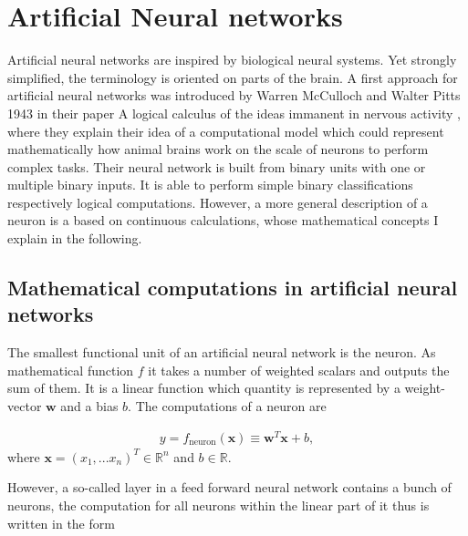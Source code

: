 




\section{Artificial Neural networks}
Artificial neural networks are inspired by biological neural systems. Yet strongly simplified, the terminology is oriented on parts of the brain. A first approach for artificial neural networks was introduced by Warren McCulloch and Walter Pitts 1943 in their paper \glqq A logical calculus of the ideas immanent in nervous activity\grqq{} \cite{mcculloch_logical_1943}, where they explain their idea of a computational model which could represent mathematically how animal brains work on the scale of neurons to perform complex tasks. Their neural network is built from binary units with one or multiple binary inputs. It is able to perform simple binary classifications respectively logical computations. However, a more general description of a neuron is a based on continuous calculations, whose mathematical concepts I explain in the following.

\subsection{Mathematical computations in artificial neural networks}
The smallest functional unit of an artificial neural network is the neuron. As mathematical function $f$ it takes a number of weighted scalars and outputs the sum of them. It is a linear function which quantity is represented by a weight-vector $\textbf{w}$ and a bias $b$. The computations of a neuron are 

\begin{align}
    y=f_{\text{neuron}}(\textbf{x})\equiv\textbf{w}^T\textbf{x}+b,
\end{align}
where $\textbf{x}=(x_1,...x_n)^T\in\mathbb{R}^n$ and $b\in\mathbb{R}$.

However, a so-called layer in a feed forward neural network contains a bunch of neurons, the computation for all neurons within the linear part of it thus is written in the form

